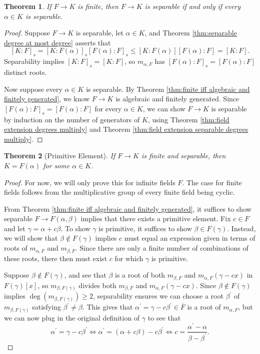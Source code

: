 \documentclass[
    parskip=half,
    toc=flat,
    toc=sectionentrydotfill,
]{scrartcl}  %
\theoremstyle{definition}
\theoremstyle{plain}
\newtheorem{theorem}{Theorem}[section]
\theoremstyle{remark}
\begin{document}
\begin{theorem}
    If $F\to K$ is finite, then $F\to K$ is separable if and only if every $\alpha\in K$ is separable.
\end{theorem}

\begin{proof}
    Suppose $F\to K$ is separable, let $\alpha\in K$, and Theorem \ref{thm:separable degree at most degree} asserts
    that \[[K:F]_s=[K:F(\alpha)]_s[F(\alpha):F]_s\leq[K:F(\alpha)][F(\alpha):F]=[K:F]\text{.}\]
    Separability implies $[K:F]_s=[K:F]$, so $m_{\alpha,F}$ has $[F(\alpha):F]_s=[F(\alpha):F]$ distinct roots.
    
    Now suppose every $\alpha\in K$ is separable.
    By Theorem \ref{thm:finite iff algebraic and finitely generated}, we know $F\to K$ is algebraic and finitely
    generated.
    Since $[F(\alpha):F]_s=[F(\alpha):F]$ for every $\alpha\in K$, we can show $F\to K$ is separable by induction on
    the number of generators of $K$, using Theorem \ref{thm:field extension degrees multiply} and Theorem
    \ref{thm:field extension separable degrees multiply}.
\end{proof}

\begin{theorem}[Primitive Element]
    If $F\to K$ is finite and separable, then $K=F(\alpha)$ for some $\alpha\in K$.
\end{theorem}

\begin{proof}
    For now, we will only prove this for infinite fields $F$.
    The case for finite fields follows from the multiplicative group of every finite field being cyclic.

    From Theorem \ref{thm:finite iff algebraic and finitely generated}, it suffices to show separable
    $F\to F(\alpha,\beta)$ implies that there exists a primitive element.
    Fix $c\in F$ and let $\gamma=\alpha+c\beta$.
    To show $\gamma$ is primitive, it suffices to show $\beta\in F(\gamma)$.
    Instead, we will show that $\beta\notin F(\gamma)$ implies $c$ must equal an expression given in terms of roots of
    $m_{\alpha,F}$ and $m_{\beta,F}$.
    Since there are only a finite number of combinations of these roots, there then must exist $c$ for which $\gamma$
    is primitive.

    Suppose $\beta\notin F(\gamma)$, and see that $\beta$ is a root of both $m_{\beta,F}$ and $m_{\alpha,F}(\gamma-cx)$
    in $F(\gamma)[x]$, so $m_{\beta,F(\gamma)}$ divides both $m_{\beta,F}$ and $m_{\alpha,F}(\gamma-cx)$.
    Since $\beta\notin F(\gamma)$ implies $\deg(m_{\beta,F(\gamma)})\geq 2$, separability ensures we can choose a root
    $\beta^\prime$ of $m_{\beta,F(\gamma)}$ satisfying $\beta^\prime\neq\beta$.
    This gives that $\alpha^\prime=\gamma-c\beta^\prime\in\overline{F}$ is a root of $m_{\alpha,F}$, but we can now
    plug in the original definition of $\gamma$ to see that
    \[\alpha^\prime=\gamma-c\beta^\prime\iff\alpha^\prime=(\alpha+c\beta)-c\beta^\prime\iff c=\frac{\alpha^\prime-\alpha}{\beta-\beta^\prime}\text{.}\]
\end{proof}
\end{document}
